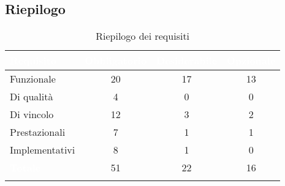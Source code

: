 \subsection{Riepilogo}
\begingroup
\setlength{\tabcolsep}{10pt}
\renewcommand{\arraystretch}{1.5}
\begin{xltabular}{\textwidth}{| X | c | c | c |}
    \hline
     \textbf{\textcolor{white}{Requisito}} & \textbf{\textcolor{white}{Obbligatorio}} & \textbf{\textcolor{white}{Desiderabile}} & \textbf{\textcolor{white}{Opzionale}}\\
    \hline
    \endhead
    Funzionale & 20 & 17 & 13 \\
    \hline
    Di qualità & 4 & 0 & 0 \\
    \hline
    Di vincolo & 12 & 3 & 2 \\
    \hline
    Prestazionali & 7 & 1 & 1 \\
    \hline
    Implementativi & 8 & 1 & 0 \\
    \hline
     \textbf{\textcolor{white}{Totale}} & 51 & 22 & 16 \\
    \hline
     \caption{Riepilogo dei requisiti}
    \label{tab:riepilogo}
\end{xltabular}
\endgroup



